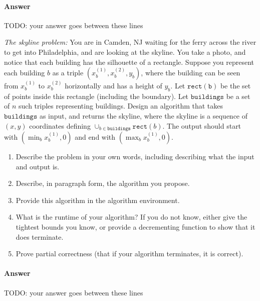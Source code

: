 \documentclass{article}
\begin{document}
\paragraph{Answer}


TODO: your answer goes between these lines


\nextprob
{}

\emph{The skyline problem:} You are in Camden, NJ waiting for the ferry across the river to
get into Philadelphia, and are looking at the skyline.  You take a photo, and notice that each building
has the silhouette of a rectangle.  Suppose you  represent each building $b$ as a
triple $(x_b^{(1)},x_b^{(2)},y_b)$, where the building can be seen from $x_b^{(1)}$ to $x_b^{(2)}$
horizontally and has a height of $y_b$.  Let $\mathtt{rect(b)}$ be the set of
points inside this rectangle (including the boundary).  Let $\mathtt{buildings}$
be a set of $n$ such triples representing buildings. Design an algorithm that takes $\mathtt{buildings}$ as input, and
returns the skyline, where the skyline is a sequence of~$(x,y)$ coordinates
defining $\cup_{b \in \mathtt{buildings}} \mathtt{rect}(b)$.  The output should
start with $(\min_b{x_b^{(1)}},0)$ and end with $(\max_b{x_b^{(1)}},0)$.

\begin{enumerate}
    \item Describe the problem in your own words, including
        describing what the input and output is.
    \item Describe, in paragraph form, the algorithm you propose.
    \item Provide this algorithm in the algorithm environment.
    \item What is the runtime of your algorithm? If you do not know, either give
        the tightest bounds you know, or provide a decrementing function to show
        that it does terminate.
    \item Prove partial correctness (that if your algorithm terminates, it is
        correct).
\end{enumerate}



\paragraph{Answer}


TODO: your answer goes between these lines

\end{document}
